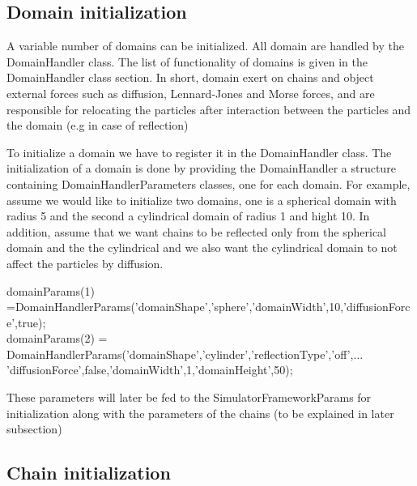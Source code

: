 \documentclass[12pt]{report}
\begin{document}
\subsection{Domain initialization}\label{subsection_domainInitialization}
A variable number of domains can be initialized. All domain are handled by the DomainHandler class. The list of functionality of domains is given in the DomainHandler class section. In short, domain exert on chains and object external forces such as diffusion, Lennard-Jones and Morse forces, and are responsible for relocating the particles after interaction between the particles and the domain (e.g in case of reflection)

To initialize a domain we have to register it in the DomainHandler class. The initialization of a domain is done by providing the DomainHandler a structure containing DomainHandlerParameters classes, one for each domain. 
For example, assume we would like to initialize two domains, one is a spherical domain with radius 5 and the second a cylindrical domain of radius 1 and hight 10. In addition, assume that we want chains to be reflected only from the spherical domain and the the cylindrical and we also want the cylindrical domain to not affect the particles by diffusion.
\begin{tiny}

domainParams(1) =DomainHandlerParams('domainShape','sphere','domainWidth',10,'diffusionForce',true);\\
domainParams(2) = DomainHandlerParams('domainShape','cylinder','reflectionType','off',...\\
                                      'diffusionForce',false,'domainWidth',1,'domainHeight',50);
\end{tiny}
                         
These parameters will later be fed to the SimulatorFrameworkParams for initialization along with the parameters of the chains (to be explained in later subsection)


\subsection{Chain initialization}\label{subsection_chainInitialization}
 
\end{document}
